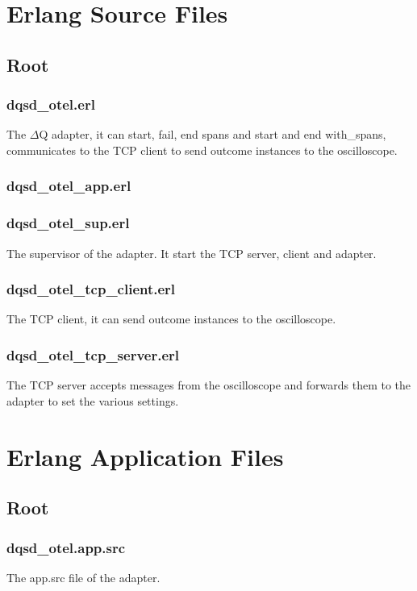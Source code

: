 \chapter{Erlang Source Files}

\section{Root}

\subsection{dqsd\_otel.erl}
The $\Delta$Q adapter, it can start, fail, end spans and start and end with\_spans, communicates to the TCP client to send outcome instances to the oscilloscope.


\subsection{dqsd\_otel\_app.erl}


\subsection{dqsd\_otel\_sup.erl}
The supervisor of the adapter. It start the TCP server, client and adapter.


\subsection{dqsd\_otel\_tcp\_client.erl}
The TCP client, it can send outcome instances to the oscilloscope.


\subsection{dqsd\_otel\_tcp\_server.erl}
The TCP server accepts messages from the oscilloscope and forwards them to the adapter to set the various settings.


\chapter{Erlang Application Files}

\section{Root}

\subsection{dqsd\_otel.app.src}
The app.src file of the adapter.

